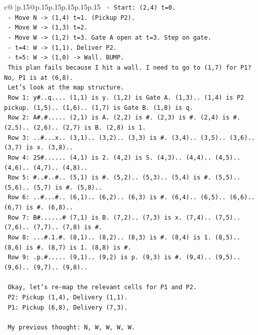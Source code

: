 \documentclass{article}
\begin{document}
{\begin{supertabular}{c@{$\;$}|p{.15\linewidth}@{}p{.15\linewidth}p{.15\linewidth}p{.15\linewidth}p{.15\linewidth}p{.15\linewidth}}
{{{\texttt{   {-} Start: (2,4) t=0.} \\
\texttt{   {-} Move N {-}> (1,4) t=1. (Pickup P2).} \\
\texttt{   {-} Move W {-}> (1,3) t=2.} \\
\texttt{   {-} Move W {-}> (1,2) t=3. Gate A open at t=3. Step on gate.} \\
\texttt{   {-} t=4: W {-}> (1,1). Deliver P2.} \\
\texttt{   {-} t=5: W {-}> (1,0) {-}> Wall. BUMP.} \\
\texttt{   This plan fails because I hit a wall. I need to go to (1,7) for P1? No, P1 is at (6,8).} \\
\texttt{   Let's look at the map structure.} \\
\texttt{   Row 1: y\#..q.... (1,1) is y. (1,2) is Gate A. (1,3).. (1,4) is P2 pickup. (1,5).. (1,6).. (1,7) is Gate B. (1,8) is q.} \\
\texttt{   Row 2: A\#.\#..... (2,1) is A. (2,2) is \#. (2,3) is \#. (2,4) is \#. (2,5).. (2,6).. (2,7) is B. (2,8) is 1.} \\
\texttt{   Row 3: ..\#...x.. (3,1).. (3,2).. (3,3) is \#. (3,4).. (3,5).. (3,6).. (3,7) is x. (3,8)..} \\
\texttt{   Row 4: 2S\#...... (4,1) is 2. (4,2) is S. (4,3).. (4,4).. (4,5).. (4,6).. (4,7).. (4,8)..} \\
\texttt{   Row 5: \#..\#..\#.. (5,1) is \#. (5,2).. (5,3).. (5,4) is \#. (5,5).. (5,6).. (5,7) is \#. (5,8)..} \\
\texttt{   Row 6: ..\#...\#.. (6,1).. (6,2).. (6,3) is \#. (6,4).. (6,5).. (6,6).. (6,7) is \#. (6,8)..} \\
\texttt{   Row 7: B\#......\# (7,1) is B. (7,2).. (7,3) is x. (7,4).. (7,5).. (7,6).. (7,7).. (7,8) is \#.} \\
\texttt{   Row 8: ...\#.1.\#. (8,1).. (8,2).. (8,3) is \#. (8,4) is 1. (8,5).. (8,6) is \#. (8,7) is 1. (8,8) is \#.} \\
\texttt{   Row 9: .p.\#..... (9,1).. (9,2) is p. (9,3) is \#. (9,4).. (9,5).. (9,6).. (9,7).. (9,8)..} \\
\\ 
\texttt{   Okay, let's re{-}map the relevant cells for P1 and P2.} \\
\texttt{   P2: Pickup (1,4), Delivery (1,1).} \\
\texttt{   P1: Pickup (6,8), Delivery (7,3).} \\
\\ 
\texttt{   My previous thought: N, W, W, W, W.} \\
}}}
\end{supertabular}}
\end{document}
